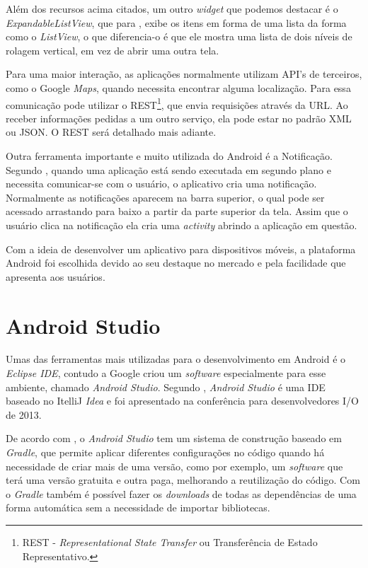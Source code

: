 	\par Além dos recursos acima citados, um outro \textit{widget} que podemos
destacar é o \textit{ExpandableListView}, que para , exibe os
itens em forma de uma lista da forma como o \textit{ListView}, o que
diferencia-o é que ele mostra uma lista de dois níveis de rolagem vertical, em
vez de abrir uma outra tela.
	
	\par Para uma maior interação, as aplicações normalmente utilizam API’s de
terceiros, como o Google \textit{Maps}, quando necessita encontrar alguma
localização. Para  essa comunicação pode utilizar o
REST\footnote{REST - \textit{Representational State Transfer} ou Transferência
de Estado Representativo.}, que envia requisições através da URL. Ao receber
informações pedidas a um outro serviço, ela pode estar no padrão XML ou JSON. O
REST será detalhado mais adiante.

	\par Outra ferramenta importante e muito utilizada do Android é a Notificação.
Segundo , quando uma aplicação está sendo executada em
segundo plano e necessita comunicar-se com o usuário, o aplicativo cria uma
notificação. Normalmente as notificações aparecem na barra superior, o qual
pode ser acessado arrastando para baixo a partir da parte superior da tela.
Assim que o usuário clica na notificação ela cria uma \textit{activity} abrindo
a aplicação em questão.

	\par Com a ideia de desenvolver um aplicativo para dispositivos móveis, a
plataforma Android foi escolhida devido ao seu destaque no mercado e pela
facilidade que apresenta aos usuários.

\section{Android Studio}

	\par Umas das ferramentas mais utilizadas para o desenvolvimento em Android é o
\textit{Eclipse IDE}, contudo a Google criou um \textit{software} especialmente
para esse ambiente, chamado \textit{Android Studio}. Segundo
, \textit{Android Studio} é uma IDE baseado no ItelliJ
\textit{Idea} e foi apresentado na conferência para desenvolvedores I/O de 2013.

	\par De acordo com , o \textit{Android Studio} tem um
sistema de construção baseado em \textit{Gradle}, que permite aplicar
diferentes configurações no código quando há necessidade de criar mais de uma
versão, como por exemplo, um \textit{software} que terá uma versão gratuita e
outra paga, melhorando a reutilização do código. Com o \textit{Gradle} também é
possível fazer os \textit{downloads} de todas as dependências de uma forma
automática sem a necessidade de importar bibliotecas.


